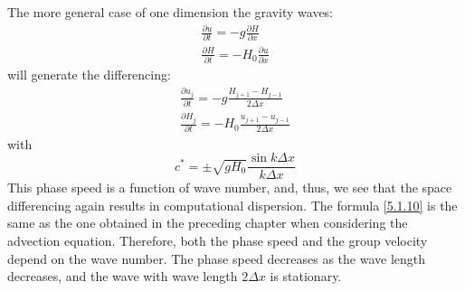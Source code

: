 The more general case of one dimension the gravity waves:
\begin{align*}
    \frac{\partial u}{\partial t}=-g\frac{\partial H}{\partial x} \\
    \frac{\partial H}{\partial t}=-H_0\frac{\partial u}{\partial x}
\end{align*}
will generate the differencing:
\begin{align}\label{5.1.6}
    \frac{\partial u_j}{\partial t}=-g\frac{H_{j+1}-H_{j-1}}{2\Delta x}\\
    \frac{\partial H_j}{\partial t}=-H_0\frac{u_{j+1}-u_{j-1}}{2\Delta x}
\end{align}
with \begin{equation}\label{5.1.10}
    c^*=\pm\sqrt{gH_0}\frac{\sin k\Delta x}{k\Delta x}
\end{equation}
This phase speed is a function of wave number, and, thus, we see that the space differencing again results in computational dispersion. The formula \ref{5.1.10} is the same as the one obtained in the preceding chapter when considering the advection equation. Therefore, both the phase speed and the group velocity depend on the wave number. The phase speed decreases as the wave length decreases, and the wave with wave length $2\Delta x$ is stationary.

